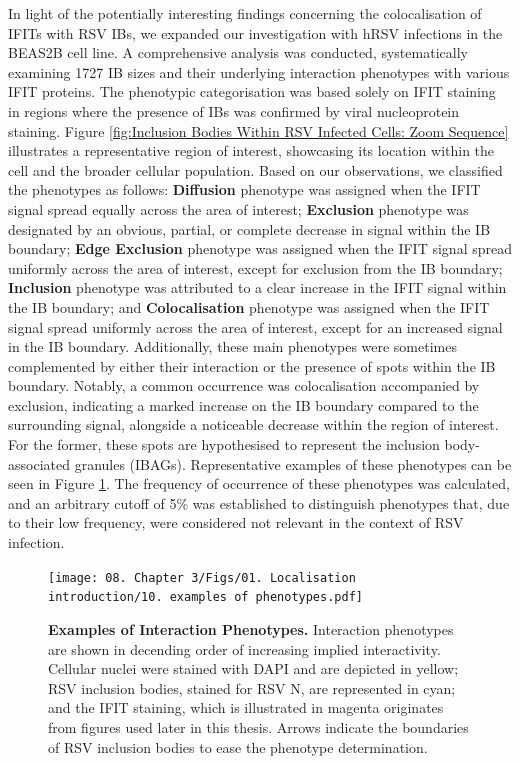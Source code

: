 In light of the potentially interesting findings concerning the colocalisation of IFITs with RSV IBs, we expanded our investigation with hRSV infections in the BEAS2B cell line. A comprehensive analysis was conducted, systematically examining 1727 IB sizes and their underlying interaction phenotypes with various IFIT proteins. The phenotypic categorisation was based solely on IFIT staining in regions where the presence of IBs was confirmed by viral nucleoprotein staining. Figure \ref{fig:Inclusion Bodies Within RSV Infected Cells: Zoom Sequence} illustrates a representative region of interest, showcasing its location within the cell and the broader cellular population. Based on our observations, we classified the phenotypes as follows: \textbf{Diffusion} phenotype was assigned when the IFIT signal spread equally across the area of interest; \textbf{Exclusion} phenotype was designated by an obvious, partial, or complete decrease in signal within the IB boundary; \textbf{Edge Exclusion} phenotype was assigned when the IFIT signal spread uniformly across the area of interest, except for exclusion from the IB boundary; \textbf{Inclusion} phenotype was attributed to a clear increase in the IFIT signal within the IB boundary; and \textbf{Colocalisation} phenotype was assigned when the IFIT signal spread uniformly across the area of interest, except for an increased signal in the IB boundary. Additionally, these main phenotypes were sometimes complemented by either their interaction or the presence of spots within the IB boundary. Notably, a common occurrence was colocalisation accompanied by exclusion, indicating a marked increase on the IB boundary compared to the surrounding signal, alongside a noticeable decrease within the region of interest. For the former, these spots are hypothesised to represent the inclusion body-associated granules (IBAGs). Representative examples of these phenotypes can be seen in Figure \ref{fig:Examples of Interaction Phenotypes}. The frequency of occurrence of these phenotypes was calculated, and an arbitrary cutoff of 5\% was established to distinguish phenotypes that, due to their low frequency, were considered not relevant in the context of RSV infection.

\begin{figure}
    \centering
    \texttt{[image: 08. Chapter 3/Figs/01. Localisation introduction/10. examples of phenotypes.pdf]}
    \caption[Examples of Interaction Phenotypes.]{\textbf{Examples of Interaction Phenotypes.} Interaction phenotypes are shown in decending order of increasing implied interactivity. Cellular nuclei were stained with DAPI and are depicted in yellow; RSV inclusion bodies, stained for RSV N, are represented in cyan; and the IFIT staining, which is illustrated in magenta originates from figures used later in this thesis. Arrows indicate the boundaries of RSV inclusion bodies to ease the phenotype determination.}
    \label{fig:Examples of Interaction Phenotypes}
\end{figure}


